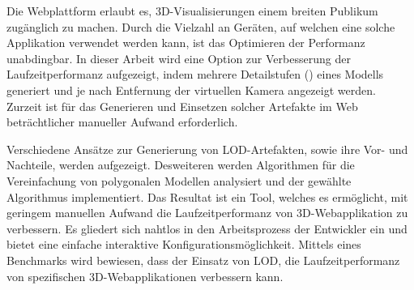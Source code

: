 Die Webplattform erlaubt es, 3D-Visualisierungen einem breiten Publikum zugänglich zu machen. Durch die Vielzahl an Geräten, auf welchen eine solche Applikation verwendet werden kann, ist das Optimieren der Performanz unabdingbar. In dieser Arbeit wird eine Option zur Verbesserung der Laufzeitperformanz aufgezeigt, indem mehrere Detailstufen () eines Modells generiert und je nach Entfernung der virtuellen Kamera angezeigt werden. Zurzeit ist für das Generieren und Einsetzen solcher Artefakte im Web beträchtlicher manueller Aufwand erforderlich.

\bigbreak
Verschiedene Ansätze zur Generierung von LOD-Artefakten, sowie ihre Vor- und Nachteile, werden aufgezeigt.
Desweiteren werden Algorithmen für die Vereinfachung von polygonalen Modellen analysiert und der gewählte Algorithmus implementiert.
\bigbreak
Das Resultat ist ein Tool, welches es ermöglicht, mit geringem manuellen Aufwand die Laufzeitperformanz von 3D-Webapplikation zu verbessern.
Es gliedert sich nahtlos in den Arbeitsprozess der Entwickler ein und bietet eine einfache interaktive Konfigurationsmöglichkeit.
Mittels eines Benchmarks wird bewiesen, dass der Einsatz von LOD, die Laufzeitperformanz von spezifischen 3D-Webapplikationen verbessern kann.
